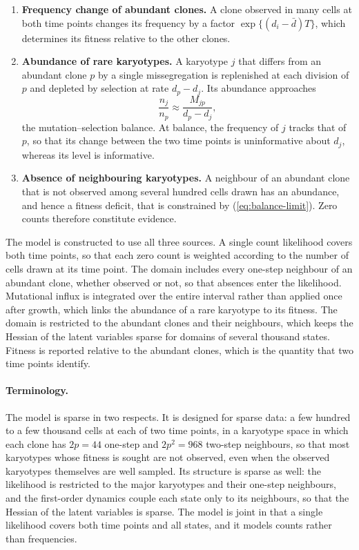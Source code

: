 \documentclass[11pt]{article}
\begin{document}
\begin{enumerate}
\item \textbf{Frequency change of abundant clones.} A clone observed in many
cells at both time points changes its frequency by a factor
$\exp\{(d_i-\bar d)T\}$, which determines its fitness relative to the other
clones.

\item \textbf{Abundance of rare karyotypes.} A karyotype $j$ that differs from
an abundant clone $p$ by a single missegregation is replenished at each
division of $p$ and depleted by selection at rate $d_p-d_j$. Its abundance
approaches
\begin{equation}
  \frac{n_j}{n_p}\approx\frac{M_{jp}}{d_p-d_j},
  \label{eq:balance-limit}
\end{equation}
the mutation--selection balance. At balance, the frequency of $j$ tracks that
of $p$, so that its change between the two time points is uninformative about $d_j$,
whereas its level is informative.

\item \textbf{Absence of neighbouring karyotypes.} A neighbour of an abundant
clone that is not observed among several hundred cells drawn has an
abundance, and hence a fitness deficit, that is constrained by
(\ref{eq:balance-limit}). Zero counts therefore constitute evidence.
\end{enumerate}

The model is constructed to use all three sources. A single count likelihood
covers both time points, so that each zero count is weighted according to the
number of cells drawn at its time point. The domain includes every one-step neighbour of an abundant
clone, whether observed or not, so that absences enter the likelihood.
Mutational influx is integrated over the entire interval rather than applied
once after growth, which links the abundance of a rare karyotype to its
fitness. The domain is restricted to the abundant clones and their
neighbours, which keeps the Hessian of the latent variables sparse for
domains of several thousand states. Fitness is reported relative to the
abundant clones, which is the quantity that two time points identify.

\paragraph{Terminology.}
The model is sparse in two respects. It is designed for sparse data: a few
hundred to a few thousand cells at each of two time points, in a karyotype space in which
each clone has $2p=44$ one-step and $2p^2=968$ two-step neighbours, so that
most karyotypes whose fitness is sought are not observed, even when the
observed karyotypes themselves are well sampled. Its structure is sparse as
well: the likelihood is restricted to the major karyotypes and their one-step
neighbours, and the first-order dynamics couple each state only to its
neighbours, so that the Hessian of the latent variables is sparse. The model
is joint in that a single likelihood covers both time points and all states, and
it models counts rather than frequencies.
\end{document}
